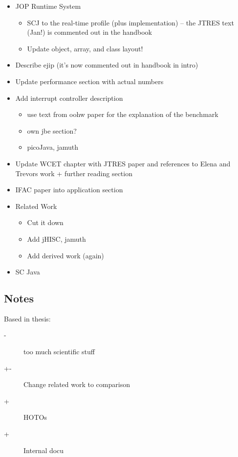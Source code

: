 \begin{itemize}
\begin{itemize}
    \end{itemize}
    \item JOP Runtime System
    \begin{itemize}
        \item SCJ to the real-time profile (plus implementation) --
        the JTRES text (Jan!) is commented out in the handbook
        \item Update object, array, and class layout!
    \end{itemize}
    \item Describe ejip (it's now commented out in handbook in intro)
    \item Update performance section with actual numbers
    \item Add interrupt controller description
    \begin{itemize}
        \item use text from oohw paper for
    the explanation of the benchmark
        \item own jbe section?
        \item picoJava, jamuth
    \end{itemize}
    \item Update WCET chapter with JTRES paper and references to
    Elena and Trevors work + further reading section
    \item IFAC paper into application section
    \item Related Work
    \begin{itemize}
        \item Cut it down
        \item Add jHISC, jamuth
        \item Add derived work (again)
    \end{itemize}
    \item SC Java
\end{itemize}

\subsection{Notes}

Based in thesis:
\begin{description}
    \item[-] too much scientific stuff
    \item[+-] Change related work to comparison
    \item[+] HOTOs
    \item[+] Internal docu
\end{description}

